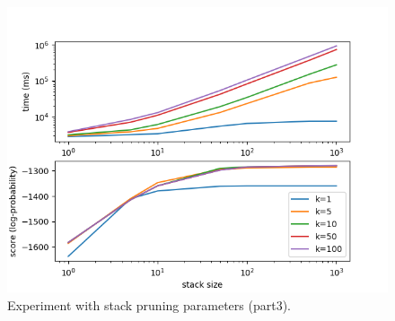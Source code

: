 \documentclass[answers]{exam}
\begin{document}
\begin{figure}
  \centering
  \includegraphics{fig-part3}
  \caption[Experiment (part3).]{Experiment with stack pruning parameters
    (part3).}
  \label{fig:exp-part3}
\end{figure}
\end{document}

